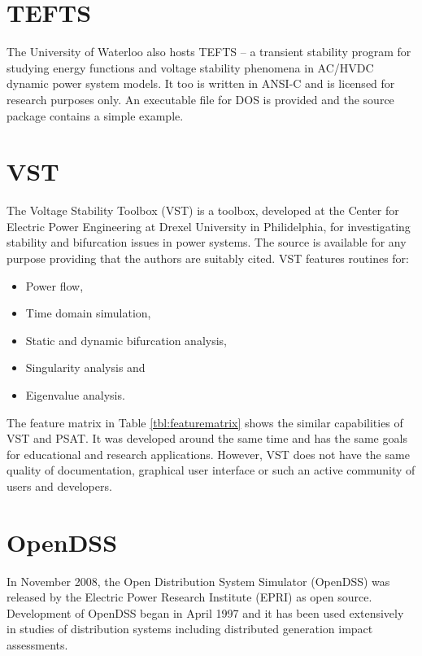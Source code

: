 \section{TEFTS}
The University of Waterloo also hosts TEFTS -- a transient stability program
for studying energy functions and voltage stability phenomena in AC/HVDC
dynamic power system models.  It too is written in ANSI-C and is licensed for
research purposes only.  An executable file for DOS is provided and the source
package contains a simple example.

\section{VST}
The Voltage Stability Toolbox (VST) is a \matlab toolbox, developed at the
Center for Electric Power Engineering at Drexel University in Philidelphia, for
investigating stability and bifurcation issues in power systems.  The source
is available for any purpose providing that the authors are suitably cited.
VST features routines for:
\begin{itemize}
  \item Power flow,
  \item Time domain simulation,
  \item Static and dynamic bifurcation analysis,
  \item Singularity analysis and
  \item Eigenvalue analysis.
\end{itemize}
The feature matrix in Table \ref{tbl:featurematrix} shows the similar
capabilities of VST and PSAT. It was developed around the same time and has
the same goals for educational and research applications.  However, VST does
not have the same quality of documentation, graphical user interface or such an
active community of users and developers.

\section{OpenDSS}
In November 2008, the Open Distribution System Simulator (OpenDSS) was released
by the Electric Power Research Institute (EPRI) as open source.  Development of
OpenDSS began in April 1997 and it has been used extensively in studies of
distribution systems including distributed generation impact assessments.

